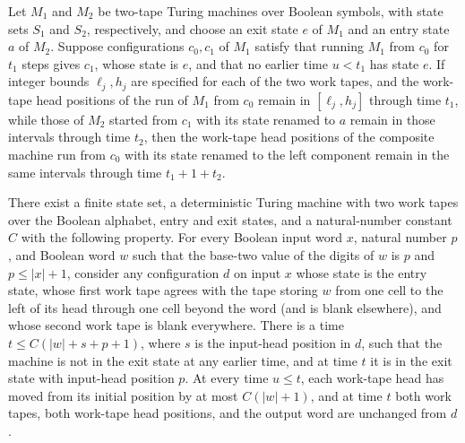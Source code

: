 \begin{theorem}
\label{Turing.inputSeek_seam_range}
\leanok
{}
Let $M_1$ and $M_2$ be two-tape Turing machines over Boolean symbols, with state sets
$S_1$ and $S_2$, respectively, and choose an exit state $e$ of $M_1$ and an entry state
$a$ of $M_2$. Suppose configurations $c_0,c_1$ of $M_1$ satisfy that running $M_1$ from
$c_0$ for $t_1$ steps gives $c_1$, whose state is $e$, and that no earlier time $u<t_1$
has state $e$. If integer bounds $\ell_j,h_j$ are specified for each of the two work
tapes, and the work-tape head positions of the run of $M_1$ from $c_0$ remain in
$[\ell_j,h_j]$ through time $t_1$, while those of $M_2$ started from $c_1$ with its
state renamed to $a$ remain in those intervals through time $t_2$, then the work-tape
head positions of the composite machine run from $c_0$ with its state renamed to the
left component remain in the same intervals through time $t_1+1+t_2$.
\end{theorem}

\begin{theorem}
\label{Turing.exists_inputSeekTM}
\leanok
{}
There exist a finite state set, a deterministic Turing machine with two work tapes over
the Boolean alphabet, entry and exit states, and a natural-number constant $C$ with the
following property. For every Boolean input word $x$, natural number $p$, and Boolean
word $w$ such that the base-two value of the digits of $w$ is $p$ and $p\le |x|+1$,
consider any configuration $d$ on input $x$ whose state is the entry state, whose first
work tape agrees with the tape storing $w$ from one cell to the left of its head through
one cell beyond the word (and is blank elsewhere), and whose second work tape is blank
everywhere. There is a time $t\le C(|w|+s+p+1)$, where $s$ is the input-head position in
$d$, such that the machine is not in the exit state at any earlier time, and at time $t$
it is in the exit state with input-head position $p$. At every time $u\le t$, each
work-tape head has moved from its initial position by at most $C(|w|+1)$, and at time
$t$ both work tapes, both work-tape head positions, and the output word are unchanged
from $d$.
\end{theorem}
